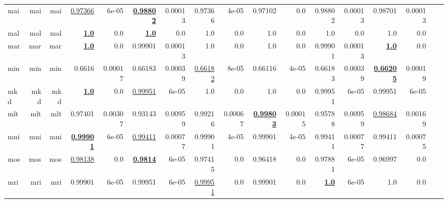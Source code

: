 \documentclass[11pt]{article}
\begin{document}
\begin{table*}[h]
{\begin{tabular}{lrrrrrrrrrrrrrrrr}
mai         & mai         & mai         & \underline{0.97366}         & 6e-05         & \textbf{\underline{0.98802}}         & 0.00013         & 0.97366         & 4e-05         & 0.97102         & 0.0         & 0.98802         & 0.00013         & 0.98701         & 0.00013         \\
mal         & mal         & mal         & \textbf{\underline{1.0}}         & 0.0         & \textbf{\underline{1.0}}         & 0.0         & 1.0         & 0.0         & 1.0         & 0.0         & 1.0         & 0.0         & 1.0         & 0.0         \\
mar         & mar         & mar         & \textbf{\underline{1.0}}         & 0.0         & 0.99901         & 0.00013         & 1.0         & 0.0         & 1.0         & 0.0         & 0.99901         & 0.00013         & \textbf{\underline{1.0}}         & 0.0         \\
min         & min         & min         & 0.6616         & 0.00017         & 0.66183         & 0.00039         & \underline{0.66182}         & 8e-05         & 0.66116         & 4e-05         & 0.66183         & 0.00039         & \textbf{\underline{0.66205}}         & 0.00019         \\
mkd         & mkd         & mkd         & \textbf{\underline{1.0}}         & 0.0         & \underline{0.99951}         & 6e-05         & 1.0         & 0.0         & 1.0         & 0.0         & 0.99951         & 6e-05         & 0.99951         & 6e-05         \\
mlt         & mlt         & mlt         & 0.97401         & 0.00307         & 0.93143         & 0.00959         & 0.99216         & 0.00067         & \textbf{\underline{0.99803}}         & 0.00015         & 0.95788         & 0.00959         & \underline{0.98684}         & 0.00169         \\
mni         & mni         & mni         & \textbf{\underline{0.99901}}         & 6e-05         & \underline{0.99411}         & 0.00077         & 0.99901         & 4e-05         & 0.99901         & 4e-05         & 0.99411         & 0.00077         & 0.99411         & 0.00075         \\
mos         & mos         & mos         & \underline{0.98138}         & 0.0         & \textbf{\underline{0.9814}}         & 6e-05         & 0.97415         & 0.0         & 0.96418         & 0.0         & 0.97881         & 6e-05         & 0.96997         & 0.0         \\
mri         & mri         & mri         & 0.99901         & 6e-05         & 0.99951         & 6e-05         & \underline{0.99951}         & 0.0         & 0.99901         & 0.0         & \textbf{\underline{1.0}}         & 6e-05         & 1.0         & 0.0         \\

\end{tabular}}
\end{table*}
\end{document}
